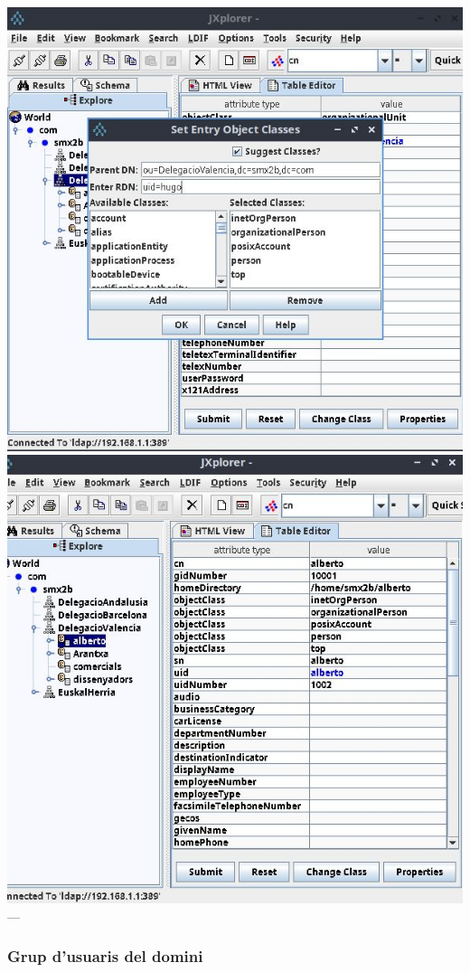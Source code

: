 \documentclass[
  12 pt,
  a4paper,
]{article}
\begin{document}
\includegraphics{png/jxplorerNouUsuari.jpg}
\includegraphics{png/atributsUsuari.jpg} ---

\subsubsection{Grup d'usuaris del
domini}\label{grup-dusuaris-del-domini}
\end{document}
